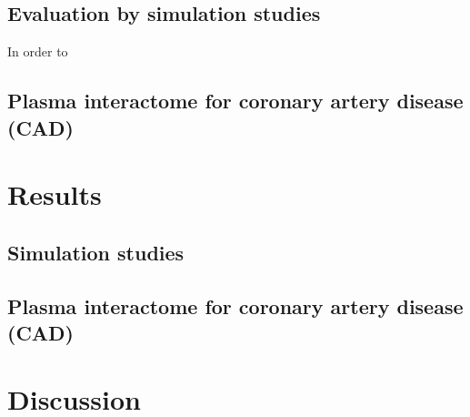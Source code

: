 \documentclass[11pt]{article}
\begin{document}
\subsection{Evaluation by simulation studies}
In order to 

\subsection{Plasma interactome for coronary artery disease (CAD)}

\section{Results}

\subsection{Simulation studies}

\subsection{Plasma interactome for coronary artery disease (CAD)}

\section{Discussion}



\nocite{*}
\end{document}

